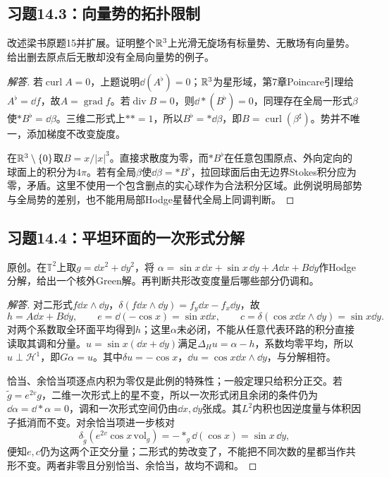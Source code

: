 \subsection*{习题14.3：向量势的拓扑限制}
改述梁书原题15并扩展。证明整个$\mathbb{R}^3$上光滑无旋场有标量势、无散场有向量势。给出删去原点后无散却没有全局向量势的例子。
\begin{proof}[解答]
若$\operatorname{curl}A=0$，上题说明$\dd(A^\flat)=0$；$\mathbb{R}^3$为星形域，第7章Poincare引理给$A^\flat=\dd f$，故$A=\operatorname{grad}f$。若$\operatorname{div}B=0$，则$\dd*(B^\flat)=0$，同理存在全局一形式$\beta$使$*B^\flat=\dd\beta$。三维二形式上$**=1$，所以$B^\flat=*\dd\beta$，即$B=\operatorname{curl}(\beta^\sharp)$。势并不唯一，添加梯度不改变旋度。

在$\mathbb{R}^3\setminus\{0\}$取$B=x/|x|^3$。直接求散度为零，而$*B^\flat$在任意包围原点、外向定向的球面上的积分为$4\pi$。若有全局$\beta$使$\dd\beta=*B^\flat$，拉回球面后由无边界Stokes积分应为零，矛盾。这里不使用一个包含删点的实心球作为合法积分区域。此例说明局部势与全局势的差别，也不能用局部Hodge星替代全局上同调判断。
\end{proof}

\subsection*{习题14.4：平坦环面的一次形式分解}
原创。在$\mathbb T^2$上取$g=\dd x^2+\dd y^2$，将
$\alpha=\sin x\,\dd x+\sin x\,\dd y+A\dd x+B\dd y$作Hodge分解，给出一个核外Green解。再判断共形改变度量后哪些部分仍调和。
\begin{proof}[解答]
对二形式$f\dd x\wedge\dd y$，$\delta(f\dd x\wedge\dd y)=f_y\dd x-f_x\dd y$，故
\[
 h=A\dd x+B\dd y,\qquad
 e=\dd(-\cos x)=\sin x\dd x,\qquad
 c=\delta(\cos x\dd x\wedge\dd y)=\sin x\dd y.
\]
对两个系数取全环面平均得到$h$；这里$\alpha$未必闭，不能从任意代表环路的积分直接读取其调和分量。$u=\sin x(\dd x+\dd y)$满足$\Delta_Hu=\alpha-h$，系数均零平均，所以$u\perp\mathcal H^1$，即$G\alpha=u$。其中$\delta u=-\cos x$，$\dd u=\cos x\dd x\wedge\dd y$，与分解相符。

恰当、余恰当项逐点内积为零仅是此例的特殊性；一般定理只给积分正交。若$\widetilde g=e^{2v}g$，二维一次形式上的星不变，所以一次形式闭且余闭的条件仍为$\dd\alpha=\dd*\alpha=0$，调和一次形式空间仍由$\dd x,\dd y$张成。其$L^2$内积也因逆度量与体积因子抵消而不变。对余恰当项进一步核对
\[
 \delta_{\widetilde g}(e^{2v}\cos x\,\mathrm{vol}_g)
 =-*_{g}\dd(\cos x)=\sin x\,\dd y,
\]
便知$e,c$仍为这两个正交分量；二形式的势改变了，不能把不同次数的星都当作共形不变。两者非零且分别恰当、余恰当，故均不调和。
\end{proof}

